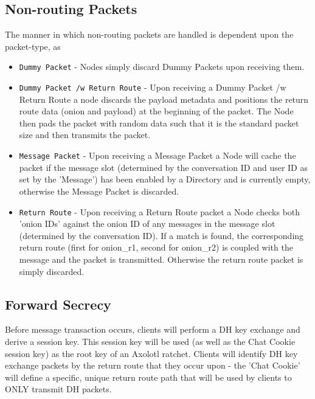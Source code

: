 \documentclass{article}
\begin{document}
\subsection{Non-routing Packets}
The manner in which non-routing packets are handled is dependent upon the packet-type, as 
\begin{itemize}
	\item \texttt{Dummy Packet} - Nodes simply discard Dummy Packets upon receiving them.
	\item \texttt{Dummy Packet /w Return Route} - Upon receiving a Dummy Packet /w Return Route a node discards the payload metadata and positions the return route data (onion and payload) at the beginning of the packet. The Node then pads the packet with random data such that it is the standard packet size and then transmits the packet.
	\item \texttt{Message Packet} - Upon receiving a Message Packet a Node will cache the packet if the message slot (determined by the conversation ID and user ID as set by the 'Message') has been enabled by a Directory and is currently empty, otherwise the Message Packet is discarded.
	\item \texttt{Return Route} - Upon receiving a Return Route packet a Node checks both 'onion IDs' against the onion ID of any messages in the message slot (determined by the conversation ID). If a match is found, the corresponding return route (first for onion\_r1, second for onion\_r2) is coupled with the message and the packet is transmitted. Otherwise the return route packet is simply discarded.
\end{itemize}

\subsection{Forward Secrecy}
Before message transaction occurs, clients will perform a DH key exchange and derive a session key. This session key will be used (as well as the Chat Cookie session key) as the root key of an Axolotl ratchet. \cite{OwsRatchet,AxoRatchetLib} Clients will identify DH key exchange packets by the return route that they occur upon - the 'Chat Cookie' will define a specific, unique return route path that will be used by clients to ONLY transmit DH packets.

\newpage
\end{document}
